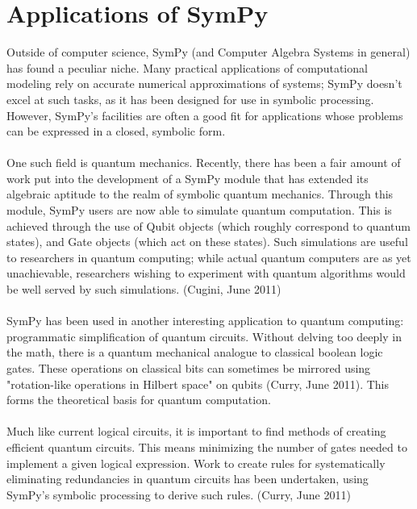 \documentclass[11pt,a4paper,oneside]{report}
\begin{document}
\section*{Applications of SymPy}
Outside of computer science, SymPy (and Computer Algebra Systems in general) has found a peculiar niche. Many practical applications of computational modeling rely on accurate numerical approximations of systems; SymPy doesn't excel at such tasks, as it has been designed for use in symbolic processing. However, SymPy's facilities are often a good fit for applications whose problems can be expressed in a closed, symbolic form.\\\\
One such field is quantum mechanics. Recently, there has been a fair amount of work put into the development of a SymPy module that has extended its algebraic aptitude to the realm of symbolic quantum mechanics. Through this module, SymPy users are now able to simulate quantum computation. This is achieved through the use of Qubit objects (which roughly correspond to quantum states), and Gate objects (which act on these states). Such simulations are useful to researchers in quantum computing; while actual quantum computers are as yet unachievable, researchers wishing to experiment with quantum algorithms would be well served by such simulations. (Cugini, June 2011)\\\\
SymPy has been used in another interesting application to quantum computing: programmatic simplification of quantum circuits. Without delving too deeply in the math, there is a quantum mechanical analogue to classical boolean logic gates. These operations on classical bits can sometimes be mirrored using "rotation-like operations in Hilbert space" on qubits (Curry, June 2011). This forms the theoretical basis for quantum computation.\\\\
Much like current logical circuits, it is important to find methods of creating efficient quantum circuits. This means minimizing the number of gates needed to implement a given logical expression. Work to create rules for systematically eliminating redundancies in quantum circuits has been undertaken, using SymPy's symbolic processing to derive such rules. (Curry, June 2011)
\end{document}

